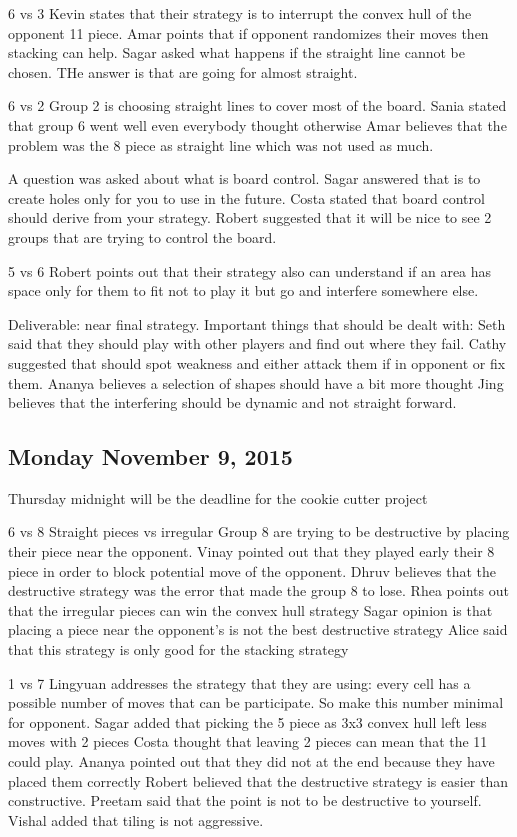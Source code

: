 6 vs 3
Kevin states that their strategy is to interrupt the convex hull of the opponent 11 piece.
Amar points that if opponent randomizes their moves then stacking can help.
Sagar asked what happens if the straight line cannot be chosen. THe answer is that are going for almost straight.


6 vs 2
Group 2 is choosing straight lines to cover most of the board.
Sania stated that group 6 went well even everybody thought otherwise
Amar believes that the problem was the 8 piece as straight line which was not used as much.

A question was asked about what is board control.
Sagar answered that is to create holes only for you to use in the future.
Costa stated that board control should derive from your strategy.
Robert suggested that it will be nice to see 2 groups that are trying to control the board.


5 vs 6
Robert points out that their strategy also can understand if an area has space only for them to fit not to play  it but go and interfere somewhere else.



Deliverable: near final strategy.
Important things that should be dealt with:
Seth said that they should play with other players and find out where they fail.
Cathy suggested that should spot weakness and either attack them if in opponent or fix them.
Ananya believes a selection of shapes should have a bit more thought
Jing believes that the interfering should be dynamic and not straight forward.
\subsection{Monday November 9, 2015}
Thursday midnight will be the deadline for the cookie cutter project


6 vs 8
Straight pieces vs irregular
Group 8 are trying to be destructive by placing their piece near the opponent.
Vinay pointed out that they played early their 8 piece in order to block potential
move of the opponent.
Dhruv believes that the destructive strategy was the error that made the group 8 to lose.
Rhea points out that the irregular pieces can win the convex hull strategy
Sagar opinion is that placing a piece near the opponent’s is not the best destructive strategy
Alice said that this strategy is only good for the stacking strategy


1 vs 7
Lingyuan addresses the strategy that they are using: every cell has a possible number of moves that can be participate. So make this number minimal for opponent.
Sagar added that picking the 5 piece as 3x3 convex hull left less moves with 2 pieces
Costa thought that leaving 2 pieces can mean that the 11 could play.
Ananya pointed out that they did not at the end because they have placed them correctly
Robert believed that the destructive strategy is easier than constructive.
Preetam said that the point is not to be destructive to yourself.
Vishal added that tiling is not aggressive.


